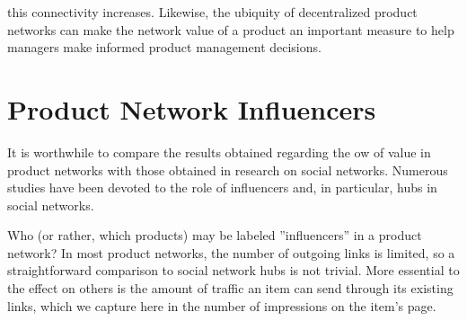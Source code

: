 \begin{table}[ht]
\caption{Estimation Results for Amazon.com: Average Values per Revenue Tier}
\centering
{}
\label{table:estimation}
\end{table}

this connectivity increases. Likewise, the ubiquity of decentralized product networks can make the network value of a product an important measure to help managers make informed product management decisions.


\section{Product Network Influencers}

It is worthwhile to compare the results obtained regarding the ow of value in product networks with those obtained in research on social networks. Numerous studies have been devoted to the role of influencers and, in particular, hubs in social networks.

Who (or rather, which products) may be labeled ”influencers” in a product network? In most product networks, the number of outgoing links is limited, so a straightforward comparison to social network hubs is not trivial. More essential to the effect on others is the amount of traffic an item can send through its existing links, which we capture here in the number of impressions on the item’s page.

